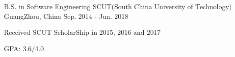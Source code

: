\begin{cventries}
  \cventry
    {B.S. in Software Engineering}
    {SCUT(South China University of Technology)}
    {GuangZhou, China}
    {Sep. 2014 - Jun. 2018}
    {
      \begin{cvitems}
        \item {Received SCUT ScholarShip in 2015, 2016 and 2017}
        \item {GPA: 3.6/4.0}
      \end{cvitems}
    }
\end{cventries}
